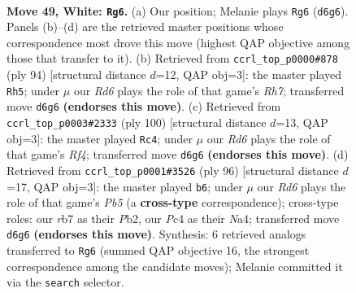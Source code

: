 \documentclass[11pt]{article}
\begin{document}
\clearpage

\begin{figure}[p]\centering
\begin{subfigure}{0.46\textwidth}\centering
\resizebox{\linewidth}{!}{%
\newchessgame
\chessboard[
  setfen={6k1/1r4b1/3R4/8/2P5/4N2K/R7/8 w - - 18 49},
  showmover=false,
  pgfstyle=straightmove, color=movearrow, markmove={d6-g6}
]}
\caption{}
\end{subfigure}\hfill
\begin{subfigure}{0.46\textwidth}\centering
\resizebox{\linewidth}{!}{%
\newchessgame
\chessboard[
  setfen={8/7R/3kb1r1/8/5K2/8/7P/8 w - - 6 48},
  showmover=false,
  pgfstyle=straightmove, color=movearrow, markmove={h7-h5}
]}
\caption{}
\end{subfigure}
\\[4pt]
\begin{subfigure}{0.46\textwidth}\centering
\resizebox{\linewidth}{!}{%
\newchessgame
\chessboard[
  setfen={8/8/2k5/2b1r3/5R2/3K1P2/8/8 w - - 0 51},
  showmover=false,
  pgfstyle=straightmove, color=movearrow, markmove={f4-c4}
]}
\caption{}
\end{subfigure}\hfill
\begin{subfigure}{0.46\textwidth}\centering
\resizebox{\linewidth}{!}{%
\newchessgame
\chessboard[
  setfen={8/8/3k4/1P1b4/N4K2/8/1P6/8 w - - 2 49},
  showmover=false,
  pgfstyle=straightmove, color=movearrow, markmove={b5-b6}
]}
\caption{}
\end{subfigure}
\caption{\textbf{Move 49, White: \texttt{Rg6}.} (a) Our position; Melanie plays \texttt{Rg6} (\texttt{d6g6}). Panels (b)--(d) are the retrieved master positions whose correspondence most drove this move (highest QAP objective among those that transfer to it). (b) Retrieved from \texttt{ccrl\_top\_p0000\#878} (ply 94) [structural distance $d$=12, QAP obj=3]: the master played \texttt{Rh5}; under $\mu$ our \emph{Rd6} plays the role of that game's \emph{Rh7}; transferred move \texttt{d6g6} \textbf{(endorses this move)}. (c) Retrieved from \texttt{ccrl\_top\_p0003\#2333} (ply 100) [structural distance $d$=13, QAP obj=3]: the master played \texttt{Rc4}; under $\mu$ our \emph{Rd6} plays the role of that game's \emph{Rf4}; transferred move \texttt{d6g6} \textbf{(endorses this move)}. (d) Retrieved from \texttt{ccrl\_top\_p0001\#3526} (ply 96) [structural distance $d$=17, QAP obj=3]: the master played \texttt{b6}; under $\mu$ our \emph{Rd6} plays the role of that game's \emph{Pb5} (a \textbf{cross-type} correspondence); cross-type roles: our \emph{r}b7 as their \emph{P}b2, our \emph{P}c4 as their \emph{N}a4; transferred move \texttt{d6g6} \textbf{(endorses this move)}. Synthesis: 6 retrieved analogs transferred to \texttt{Rg6} (summed QAP objective 16, the strongest correspondence among the candidate moves); Melanie committed it via the \texttt{search} selector.}
\label{fig:thought-m96}
\end{figure}
\end{document}
